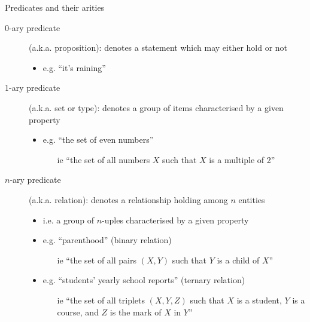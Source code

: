 \documentclass[presentation]{beamer}\mode<presentation>{\usetheme{AMSBolognaFC}}
\begin{document}
\begin{frame}{Predicates and their arities}

    \begin{description}
        \item[0-ary predicate] (a.k.a. \alert{proposition}): denotes a statement which may either hold or not
        \begin{itemize}
            \item e.g. ``it's raining''
        \end{itemize}

        \vfill

        \item[1-ary predicate] (a.k.a. \alert{set} or \alert{type}): denotes a group of items characterised by a given property
        \begin{itemize}
            \item e.g. ``the set of even numbers''
            \begin{itemize}
                \item[ie] ``the set of all numbers $X$ such that $X$ is a multiple of 2''
            \end{itemize}
        \end{itemize}

        \vfill

        \item[$n$-ary predicate] (a.k.a. \alert{relation}): denotes a relationship holding among $n$ entities
        \begin{itemize}
            \item i.e. a group of $n$-uples characterised by a given property

            \item e.g. ``parenthood'' (binary relation)
            \begin{itemize}
                \item[ie] ``the set of all pairs $(X, Y)$ such that $Y$ is a child of $X$''
            \end{itemize}

            \item e.g. ``students' yearly school reports'' (ternary relation)
            \begin{itemize}
                \item[ie] ``the set of all triplets $(X, Y, Z)$ such that $X$ is a student, $Y$ is a course, and $Z$ is the mark of $X$ in $Y$''
            \end{itemize}
        \end{itemize}
    \end{description}
\end{frame}
\end{document}
